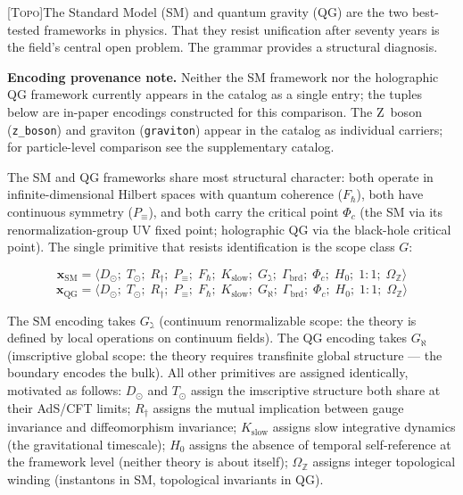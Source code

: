 \documentclass[12pt,a4paper]{article}
\newcommand{\Phic}{\Phi_c}
\newcommand{\OmegaZ}{\Omega_{\mathbb{Z}}}
\newcommand{\TOPO}{\textsc{[Topo]}}
\begin{document}
\TOPO\quad The Standard Model (SM) and quantum gravity (QG) are the two
best-tested frameworks in physics. That they resist unification after
seventy years is the field's central open problem. The grammar provides
a structural diagnosis.

\textbf{Encoding provenance note.} Neither the SM framework nor the
holographic QG framework currently appears in the catalog as a single
entry; the tuples below are in-paper encodings constructed for this
comparison. The Z~boson (\texttt{z\_boson}) and graviton
(\texttt{graviton}) appear in the catalog as individual carriers;
for particle-level comparison see the supplementary catalog.

The SM and QG frameworks share most structural character: both operate
in infinite-dimensional Hilbert spaces with quantum coherence ($F_\hbar$),
both have continuous symmetry ($P_\equiv$), and both carry the critical
point $\Phic$ (the SM via its renormalization-group UV fixed point;
holographic QG via the black-hole critical point). The single primitive
that resists identification is the scope class $G$:

\begin{equation}
  \mathbf{x}_\text{SM} =
  \langle D_\odot;\; T_\odot;\; R_\dagger;\; P_\equiv;\; F_\hbar;\;
  K_\text{slow};\; G_\gimel;\; \Gamma_\text{brd};\; \Phic;\; H_0;\;
  1{:}1;\; \OmegaZ \rangle
  \label{eq:sm_framework}
\end{equation}
\begin{equation}
  \mathbf{x}_\text{QG} =
  \langle D_\odot;\; T_\odot;\; R_\dagger;\; P_\equiv;\; F_\hbar;\;
  K_\text{slow};\; G_\aleph;\; \Gamma_\text{brd};\; \Phic;\; H_0;\;
  1{:}1;\; \OmegaZ \rangle
  \label{eq:qg_framework}
\end{equation}

\noindent The SM encoding takes $G_\gimel$ (continuum renormalizable scope:
the theory is defined by local operations on continuum fields). The QG
encoding takes $G_\aleph$ (imscriptive global scope: the theory requires
transfinite global structure --- the boundary encodes the bulk). All
other primitives are assigned identically, motivated as follows:
$D_\odot$ and $T_\odot$ assign the imscriptive structure both share
at their AdS/CFT limits; $R_\dagger$ assigns the mutual implication
between gauge invariance and diffeomorphism invariance; $K_\text{slow}$
assigns slow integrative dynamics (the gravitational timescale); $H_0$
assigns the absence of temporal self-reference at the framework level
(neither theory is about itself); $\OmegaZ$ assigns integer topological
winding (instantons in SM, topological invariants in QG).
\end{document}

